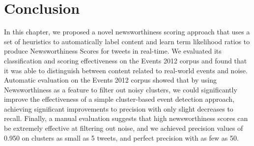 
\section{Conclusion}
\label{scoring:sec:discussion}

In this chapter, we proposed a novel newsworthiness scoring approach that uses a set of heuristics to automatically label content and learn term likelihood ratios to produce Newsworthiness Scores for tweets in real-time.
We evaluated its classification and scoring effectiveness on the Events 2012 corpus and found that it was able to distinguish between content related to real-world events and noise.
Automatic evaluation on the Events 2012 corpus showed that by using Newsworthiness as a feature to filter out noisy clusters, we could significantly improve the effectiveness of a simple cluster-based event detection approach, achieving significant improvements to precision with only slight decreases to recall.
Finally, a manual evaluation suggests that high newsworthiness scores can be extremely effective at filtering out noise, and we achieved precision values of 0.950 on clusters as small as 5 tweets, and perfect precision with as few as 50.